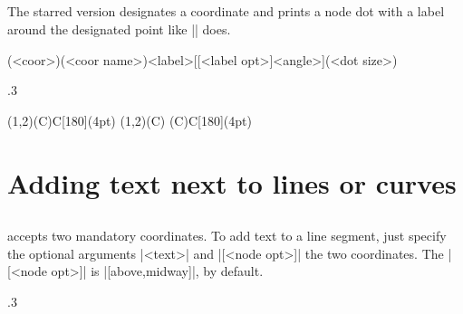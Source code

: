 \subsection{\protect\cmd{\tzcoor*}}
\label{ssi:tzcoor*}

The starred version \icmd{\tzcoor*} designates a coordinate and prints a node dot with a label around the designated point like |\tzdot*| does.

\begin{tzdef}{}
(<coor>)(<coor name>){<label>}[[<label opt>]<angle>](<dot size>)
\end{tzdef}

\begin{tzcode}{.3}
\end{tzcode}

\begin{tztikz}{}
\tzcoor*(1,2)(C){C}[180](4pt)  %
  \tzcoor(1,2)(C)
  \tzdot*(C){C}[180](4pt)
\end{tztikz}

\section{Adding text next to lines or curves}
\label{si:texttolines}

\subsection{\protect\cmd{\tzline}}
\label{ssi:texttotzline}

\icmd{\tzline} accepts two mandatory coordinates.
To add text to a line segment, just specify the optional arguments |{<text>}| and |[<node opt>]|  the two coordinates. The |[<node opt>]| is |[above,midway]|, by default.

\begin{tzcode}{.3}
\end{tzcode}


